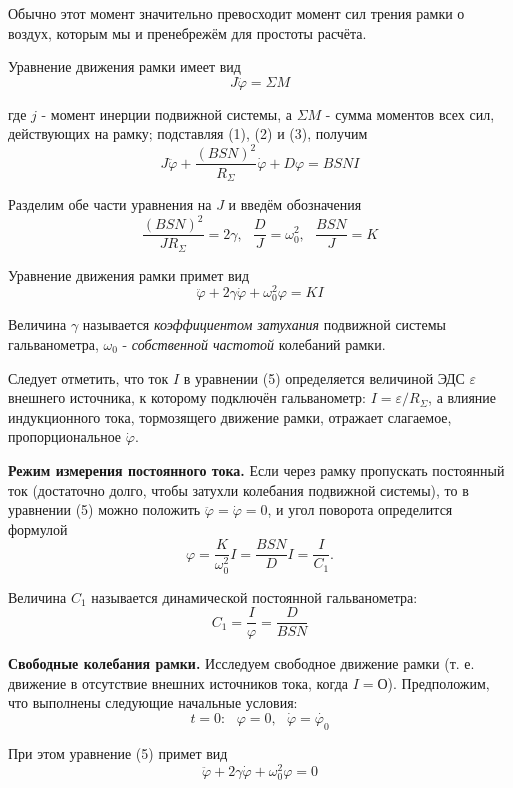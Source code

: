 \documentclass[14pt]{article}
\begin{document}
Обычно этот момент значительно превосходит момент сил трения рамки о воздух, которым мы и пренебрежём для простоты расчёта.

Уравнение движения рамки имеет вид
$$
	J\ddot{\varphi} = \Sigma M
$$

где $j$ - момент инерции подвижной системы, а $\Sigma M$ - сумма моментов всех сил, действующих на рамку; подставляя (1), (2) и (3), получим
$$
	J\ddot{\varphi} + \frac{(BSN)^2}{R_\Sigma}\dot{\varphi} + D\varphi = BSNI
$$

Разделим обе части уравнения на $J$ и введём обозначения
\begin{equation}
	\frac{(BSN)^2}{JR_\Sigma} = 2\gamma,~~~\frac{D}{J} = \omega_0^2,~~~\frac{BSN}{J} = K
\end{equation}

Уравнение движения рамки примет вид
\begin{equation}
	\ddot{\varphi} + 2\gamma\dot{\varphi} + \omega_0^2\varphi = KI
\end{equation}

Величина $\gamma$ называется \textsl{коэффициентом затухания} подвижной системы гальванометра, $\omega_0$ - \textsl{собственной частотой} колебаний рамки.

Следует отметить, что ток $I$ в уравнении (5) определяется величиной ЭДС $\varepsilon$ внешнего источника, к которому подключён гальванометр: $I = \varepsilon/R_\Sigma$, а влияние индукционного тока, тормозящего движение рамки, отражает слагаемое, пропорциональное $\dot{\varphi}$.

\textbf{Режим измерения постоянного тока.} Если через рамку пропускать постоянный ток (достаточно долго, чтобы затухли колебания подвижной системы), то в уравнении (5) можно положить $\ddot{\varphi} = \dot{\varphi} = 0$, и угол поворота определится формулой
$$
	\varphi = \frac{K}{\omega_0^2}I = \frac{BSN}{D}I = \frac{I}{C_1}.
$$

Величина $C_1$ называется динамической постоянной гальванометра:
$$
	C_1 = \frac{I}{\varphi} = \frac{D}{BSN}
$$

\textbf{Свободные колебания рамки.} Исследуем свободное движение рамки (т. е. движение в отсутствие внешних источников тока, когда $I = О$).
Предположим, что выполнены следующие начальные условия:
\begin{equation}
	t = 0:~~~\varphi = 0,~~~\dot{\varphi} = \dot{\varphi_0}
\end{equation}

При этом уравнение (5) примет вид
\begin{equation}
	\ddot{\varphi} + 2\gamma\dot{\varphi} + \omega_0^2\varphi = 0
\end{equation}
\end{document}
